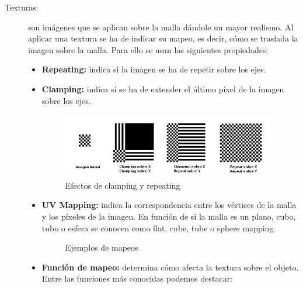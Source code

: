 \begin{description}
\item [Texturas:] son imágenes que se aplican sobre la malla dándole un mayor realismo. Al aplicar una textura se ha de indicar su mapeo, es decir, cómo se traslada la imagen sobre la malla. Para ello se usan las siguientes propiedades:

\begin{itemize}
\item \textbf{Repeating:} indica si la imagen se ha de repetir sobre los ejes.
\item \textbf{Clamping:} indica si se ha de extender el último píxel de la imagen sobre los ejes.

\begin{figure}[h!]
\centering	  
\includegraphics[width=12cm]{img/ClampingRepeatMapping.jpg}
\caption{Efectos de clamping y repeating}
\end{figure}

\item \textbf{UV Mapping:} indica la correspondencia entre los vértices de la malla y los píxeles de la imagen. En función de si la malla es un plano, cubo, tubo o esfera se conocen como flat, cube, tube o sphere mapping.
\begin{figure}[h]
	\centering	  
	\caption{Ejemplos de mapeos}
\end{figure}
\label{funcionesMapeo}
\item \textbf{Función de mapeo:} determina cómo afecta la textura sobre el objeto. Entre las funciones más conocidas podemos destacar:



\end{itemize}
\end{description}
